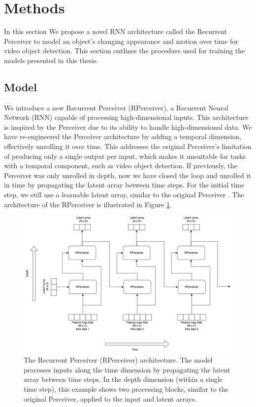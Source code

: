 \section{Methods}  \label{Methods}

In this section We propose a novel RNN architecture called the Recurrent Perceiver to model an object's changing appearance and motion over time for video object detection.
This section outlines the procedure used for training the models presented in this thesis.

\subsection{Model} \label{Methods:Model}

We introduce a new Recurrent Perceiver (RPerceiver), a Recurrent Neural Network (RNN) capable of processing high-dimensional inputs. This architecture is inspired by the Perceiver \cite{jaeglePerceiverGeneralPerception2021} due to its ability to handle high-dimensional data.
We have re-engineered the Perceiver architecture by adding a temporal dimension, effectively unrolling it over time. This addresses the original Perceiver's limitation of producing only a single output per input, which makes it unsuitable for tasks with a temporal component, such as video object detection. If previously, the Perceiver was only unrolled in depth, now we have closed the loop and unrolled it in time by propagating the latent array between time steps. For the initial time step, we still use a learnable latent array, similar to the original Perceiver \cite{jaeglePerceiverGeneralPerception2021}.
The architecture of the RPerceiver is illustrated in Figure \ref{fig:figure_methods_recurrent_perceiver}.

\begin{figure}
    \centering
    \includegraphics[width=\textwidth]{figures/figure_methods_recurrent_perceiver.png}
    \caption{The Recurrent Perceiver (RPerceiver) architecture. The model processes inputs along the time dimension by propagating the latent array between time steps. In the depth dimension (within a single time step), this example shows two processing blocks, similar to the original Perceiver, applied to the input and latent arrays.}
    \label{fig:figure_methods_recurrent_perceiver}
\end{figure}

